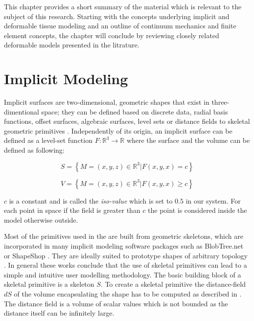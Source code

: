 \label{chapter:background}

\newlength{\savedunitlength}
\setlength{\unitlength}{2em}
This chapter provides a short summary of the material which is relevant to the subject of this research. Starting with the concepts underlying 
implicit and deformable tissue modeling and an outline of continuum mechanics and finite element concepts, the chapter will conclude by reviewing closely related 
deformable models presented in the litrature. 

\section{Implicit Modeling}
Implicit surfaces are two-dimensional, geometric shapes that exist in three-dimentional space; they can be defined based on discrete data, 
radial basis functions, offset surfaces, algebraic surfaces, level sets or distance fields to skeletal geometric primitives \cite{Bloomenthal1997}.
Independently of its origin, an implicit surface can be defined as a level-set function $F:\mathbb{R}^3 \rightarrow \mathbb{R}$ where the surface 
and the volume can be defined as following:

\begin{equation}
S = \left\{M = (x,y,z) \in \mathbb{R}^3 | F(x,y,x) = c\right\}
\end{equation}

\begin{equation}
V = \left\{M = (x,y,z) \in \mathbb{R}^3 | F(x,y,x) \geq c\right\}
\end{equation}

$c$ is a constant and is called the \textit{iso-value} which is set to $0.5$ in our system. For each point in space if the field is greater than
$c$ the point is considered inside the model otherwise outside. 

Most of the primitives used in the \blob are built from geometric skeletons, which are incorporated in many implicit modeling software packages 
such as BlobTree.net \cite{de2008blobtree} or ShapeShop \cite{Schmidt2006}. They are ideally suited to prototype shapes of arbitrary topology 
\cite{Bloomenthal1997}. In general these works conclude that the use of skeletal primitives can lead to a simple and intuitive user modelling 
methodology. The basic building block of a skeletal primitive is a skeleton $S$. To create a skeletal primitive the distance-field $dS$ of the 
volume encapsulating the shape has to be computed as described in \cite{Barbier2004}. The distance field is a volume of scalar values which is 
not bounded as the distance itself can be infinitely large.

